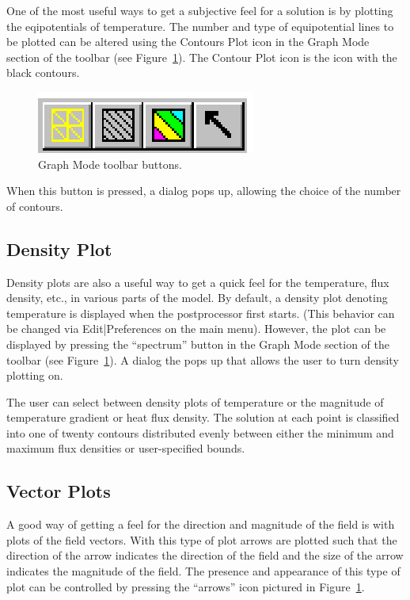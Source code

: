 One of the most useful ways to get a subjective feel for a solution
is by plotting the eqipotentials of temperature. The number and type of equipotential
lines to be plotted can be altered using the Contours Plot icon in
the Graph Mode section of the toolbar (see Figure~\ref{hfig17}). The
Contour Plot icon is the icon with the black contours.

\begin{figure}[htbp]
\centerline{\includegraphics{hplotbar.ps}}
\caption{Graph Mode toolbar buttons.}
\label{hfig17}
\end{figure}

When this button is pressed, a dialog pops up, allowing the choice of the
number of contours.

\subsection{Density Plot}

Density plots are also a useful way to get a quick feel for the
temperature, flux density, etc., in various parts of the model. By default,
a density plot denoting temperature is displayed when the postprocessor first starts.
(This behavior can be changed via Edit|Preferences on the main menu).
However, the plot can be displayed by pressing the ``spectrum'' button in
the Graph Mode section of the toolbar (see Figure~\ref{hfig17}). A
dialog the pops up that allows the user to turn density plotting
on.

The user can select between density plots of temperature or the magnitude of
temperature gradient or heat flux density. The solution at each
point is classified into one of twenty contours distributed evenly between
either the minimum and maximum flux densities or user-specified bounds.

\subsection{Vector Plots}

A good way of getting a feel for the direction and magnitude of the
field is with plots of the field vectors. With this type of plot
arrows are plotted such that the direction of the arrow indicates
the direction of the field and the size of the arrow indicates the
magnitude of the field. The presence and appearance of this type of
plot can be controlled by pressing the ``arrows'' icon pictured in
Figure~\ref{hfig17}.

